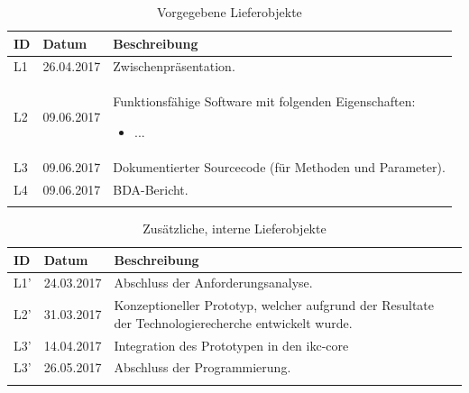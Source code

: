 \begin{longtable}{|p{1cm} | p{2cm} | p{8.1cm}|}
  \hline
    ID & Datum &  Beschreibung \\\hline
    L1 & 26.04.2017 & Zwischenpräsentation.\\\hline
    L2 & 09.06.2017 & Funktionsfähige Software mit folgenden Eigenschaften:
    \begin{itemize}
        \item ...
    \end{itemize}
    \\\hline
    L3 & 09.06.2017 & Dokumentierter Sourcecode (für Methoden und Parameter).\\\hline
    L4 & 09.06.2017 & \gls{BDA}-Bericht.\\\hline
    \caption{Vorgegebene Lieferobjekte}
  \label{tab:set-lieferobjekte}
\end{longtable}
 
\begin{longtable}{|p{1cm} | p{2cm} | p{8.1cm}|}
  \hline
    ID & Datum &  Beschreibung \\\hline
    L1' & 24.03.2017 & Abschluss der Anforderungsanalyse.\\\hline
    L2' & 31.03.2017 & Konzeptioneller Prototyp, welcher aufgrund der Resultate der Technologierecherche entwickelt wurde.\\\hline
    L3' & 14.04.2017 & Integration des Prototypen in den \gls{ikc-core}\\\hline
    L3' & 26.05.2017 & Abschluss der Programmierung.\\\hline
    \caption{Zusätzliche, interne Lieferobjekte}
  \label{tab:add-lieferobjekte}
\end{longtable}



